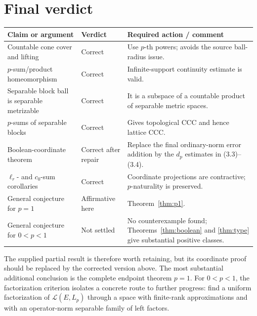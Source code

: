 \documentclass[11pt]{article}
\theoremstyle{definition}
\newcommand{\calL}{\mathcal L}
\begin{document}
\section{Final verdict}

\begin{center}
\begin{tabular}{p{}p{}p{}}
\toprule
Claim or argument & Verdict & Required action / comment\\
\midrule
Countable cone cover and lifting & Correct & Use $p$-th powers; avoids the source ball-radius issue.\\
$p$-sum/product homeomorphism & Correct & Infinite-support continuity estimate is valid.\\
Separable block ball is separable metrizable & Correct & It is a subspace of a countable product of separable metric spaces.\\
$p$-sums of separable blocks & Correct & Gives topological CCC and hence lattice CCC.\\
Boolean-coordinate theorem & Correct after repair & Replace the final ordinary-norm error addition by the $d_p$ estimates in (3.3)--(3.4).\\
$\ell_r$- and $c_0$-sum corollaries & Correct & Coordinate projections are contractive; $p$-naturality is preserved.\\
General conjecture for $p=1$ & Affirmative here & Theorem~\ref{thm:p1}.\\
General conjecture for $0<p<1$ & Not settled & No counterexample found; Theorems~\ref{thm:boolean} and \ref{thm:type} give substantial positive classes.\\
\bottomrule
\end{tabular}
\end{center}

The supplied partial result is therefore worth retaining, but its coordinate
proof should be replaced by the corrected version above.  The most substantial
additional conclusion is the complete endpoint theorem $p=1$.  For $0<p<1$,
the factorization criterion isolates a concrete route to further progress:
find a uniform factorization of $\calL(E,L_p)$ through a space with finite-rank
approximations and with an operator-norm separable family of left factors.
\end{document}
